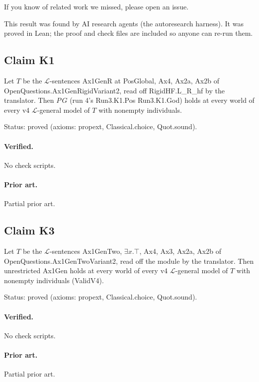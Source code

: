 \documentclass{article}
\begin{document}
If you know of related work we missed, please open an issue.

This result was found by AI research agents (the autoresearch harness). It was proved in Lean; the proof and check files are included so anyone can re-run them.

\subsection*{Claim K1}

Let $T$ be the $\mathcal L$-sentences Ax1GenR at PosGlobal, Ax4, Ax2a, Ax2b of OpenQuestions.Ax1GenRigidVariant2, read off RigidHF.L\_R\_hf by the translator. Then $P\,G$ (run 4's Run3.K1.Pos Run3.K1.God) holds at every world of every v4 $\mathcal L$-general model of $T$ with nonempty individuals.

Status: proved (axioms: propext, Classical.choice, Quot.sound).

\paragraph{Verified.}
No check scripts.

\paragraph{Prior art.} Partial prior art.

\subsection*{Claim K3}

Let $T$ be the $\mathcal L$-sentences Ax1GenTwo, $\exists x.\top$, Ax4, Ax3, Ax2a, Ax2b of OpenQuestions.Ax1GenTwoVariant2, read off the module by the translator. Then unrestricted Ax1Gen holds at every world of every v4 $\mathcal L$-general model of $T$ with nonempty individuals (ValidV4).

Status: proved (axioms: propext, Classical.choice, Quot.sound).

\paragraph{Verified.}
No check scripts.

\paragraph{Prior art.} Partial prior art.
\end{document}
